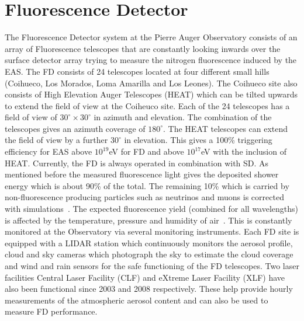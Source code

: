 \section{Fluorescence Detector}
\label{sec:Fl_det}
The Fluorescence Detector system at the Pierre Auger Observatory consists of an array of Fluorescence telescopes that are constantly looking inwards over the surface detector array trying to measure the nitrogen fluorescence induced by the EAS. The FD consists of 24 telescopes located at four different small hills (Coihueco, Los Morados, Loma Amarilla and Los Leones). The Coihueco site also consists of High Elevation Auger Telescopes (HEAT) which can be tilted upwards to extend the field of view at the Coiheuco site. Each of the 24 telescopes has a field of view of $30^{\circ} \times 30^{\circ}$ in azimuth and elevation. The combination of the telescopes gives an azimuth coverage of $180^{\circ}$. The HEAT telescopes can extend the field of view by a further $30^{\circ}$ in elevation. This gives a 100\% triggering efficiency for EAS above $10^{19}$eV for FD and above $10^{17}$eV with the inclusion of HEAT. Currently, the FD is always operated in combination with SD. As mentioned before the measured fluorescence light gives the deposited shower energy which is about 90\% of the total. The remaining 10\% which is carried by non-fluorescence producing particles such as neutrinos and muons is corrected with simulations~\cite{Abraham_2010_FD}. The expected fluorescence yield (combined for all wavelengths) is affected by the temperature, pressure and humidity of air~\cite{Rosado:2014bya}. This is constantly monitored at the Observatory via several monitoring instruments. Each FD site is equipped with a LIDAR station which continuously monitors the aerosol profile, cloud and sky cameras which photograph the sky to estimate the cloud coverage and wind and rain sensors for the safe functioning of the FD telescopes. Two laser facilities Central Laser Facility (CLF) and eXtreme Laser Facility (XLF) have also been functional since 2003 and 2008 respectively. These help provide hourly measurements of the atmospheric aerosol content and can also be used to measure FD performance. 



